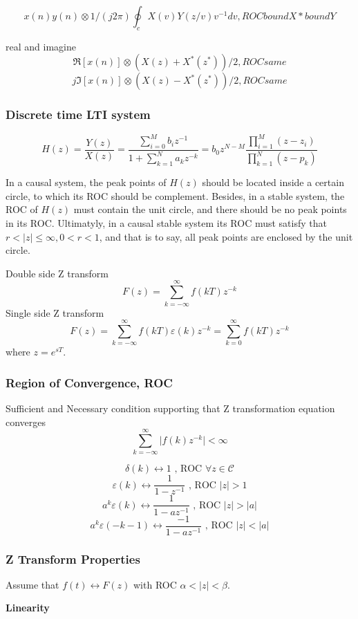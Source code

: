 \[ x(n)y(n) \otimes 1/(j2\pi) \oint_c X(v)Y(z/v)v^{-1} dv, ROC boundX*boundY\]

real and imagine
\[ \Re[x(n)] \otimes (X(z)+X^*(z^*))/2, ROC same\]
\[ j\Im[x(n)] \otimes (X(z)-X^*(z^*))/2, ROC same\]

\subsubsection{Discrete time LTI system}
\[ H(z) = \frac{Y(z)}{X(z)} = \frac{\sum\limits_{i=0}^M b_i z^{-1} }{1 + \sum\limits_{k=1}^N a_k z^{-k} }
= b_0 z^{N-M} \frac{\prod\limits_{i=1}^M (z-z_i)}{\prod\limits_{k=1}^N (z-p_k) } \]

In a causal system, the peak points of $H(z)$ should be located inside
a certain circle, to which its ROC should be complement.
Besides, in a stable system, the ROC of $H(z)$ must contain the unit circle,
and there should be no peak points in its ROC. 
Ultimatyly, in a causal stable system its ROC must satisfy that
$r < |z| \leq \infty, 0<r<1$,
and that is to say, all peak points are enclosed by the unit circle.


 Double side Z transform
 \[ F(z) = \sum_{k=-\infty}^\infty f(kT) z^{-k}\]
 Single side Z transform
 \[ F(z) = \sum_{k=-\infty}^\infty f(kT)\varepsilon(k)z^{-k} = \sum_{k=0}^\infty f(kT) z^{-k}\]
 where $z = e^{sT}$.

 \subsubsection{Region of Convergence, ROC}

 Sufficient and Necessary condition supporting that Z transformation equation converges
 \[ \sum_{k=-\infty}^\infty \big| f(k)z^{-k} \big| < \infty\]

 \[ \delta(k) \leftrightarrow 1 \text{ , ROC } \forall z \in \mathcal{C} \]
 \[ \varepsilon(k) \leftrightarrow \frac{1}{1-z^{-1}} \text{ , ROC } |z| > 1\]
 \[ a^k\varepsilon(k) \leftrightarrow \frac{1}{1-az^{-1}} \text{ , ROC } |z| > |a|\]
 \[ a^k\varepsilon(-k-1) \leftrightarrow \frac{-1}{1-az^{-1}} \text{ , ROC } |z| < |a|\]

 \subsubsection{Z Transform Properties}
 Assume that $f(t) \leftrightarrow F(z)$ with ROC $\alpha < |z| < \beta$.
 
 {\bf Linearity}

